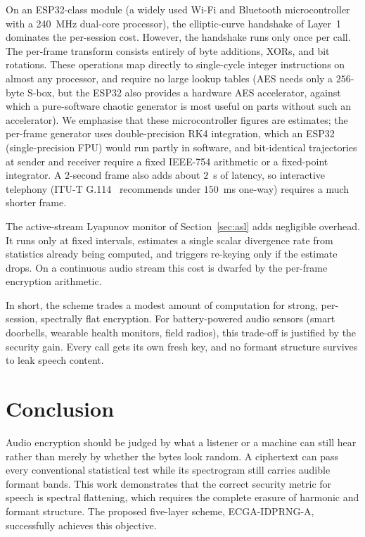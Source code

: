 \documentclass[pdflatex,sn-mathphys-num]{sn-jnl}%
\theoremstyle{thmstyleone}%
\theoremstyle{thmstyletwo}%
\theoremstyle{thmstylethree}%
\begin{document}
On an ESP32-class module (a widely used Wi-Fi and Bluetooth microcontroller with a 240~MHz dual-core processor), the elliptic-curve handshake of Layer~1 dominates the per-session cost. However, the handshake runs only once per call. The per-frame transform consists entirely of byte additions, XORs, and bit rotations. These operations map directly to single-cycle integer instructions on almost any processor, and require no large lookup tables (AES needs only a $256$-byte S-box, but the ESP32 also provides a hardware AES accelerator, against which a pure-software chaotic generator is most useful on parts without such an accelerator). We emphasise that these microcontroller figures are estimates; the per-frame generator uses double-precision RK4 integration, which an ESP32 (single-precision FPU) would run partly in software, and bit-identical trajectories at sender and receiver require a fixed IEEE-754 arithmetic or a fixed-point integrator. A $2$-second frame also adds about $2$~s of latency, so interactive telephony (ITU-T G.114~\cite{itug114} recommends under $150$~ms one-way) requires a much shorter frame.

The active-stream Lyapunov monitor of Section~\ref{sec:asl} adds negligible overhead. It runs only at fixed intervals, estimates a single scalar divergence rate from statistics already being computed, and triggers re-keying only if the estimate drops. On a continuous audio stream this cost is dwarfed by the per-frame encryption arithmetic.

In short, the scheme trades a modest amount of computation for strong, per-session, spectrally flat encryption. For battery-powered audio sensors (smart doorbells, wearable health monitors, field radios), this trade-off is justified by the security gain. Every call gets its own fresh key, and no formant structure survives to leak speech content.

\section{Conclusion}
\label{sec:conclusion}

Audio encryption should be judged by what a listener or a machine can still hear rather than merely by whether the bytes look random. A ciphertext can pass every conventional statistical test while its spectrogram still carries audible formant bands. This work demonstrates that the correct security metric for speech is spectral flattening, which requires the complete erasure of harmonic and formant structure. The proposed five-layer scheme, ECGA-IDPRNG-A, successfully achieves this objective.
\end{document}
